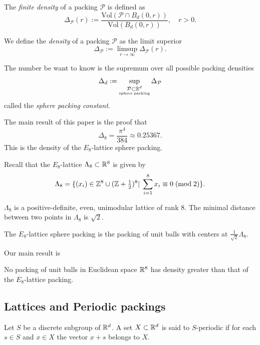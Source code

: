 \begin{definition}\label{def: finite density}
  The \emph{finite density} of a packing $\mathcal{P}$ is defined as
$$\Delta_{\mathcal{P}}(r):=\frac{\mathrm{Vol}(\mathcal{P}\cap B_d(0,r))}{\mathrm{Vol}(B_d(0,r))},\quad r>0.$$
\end{definition}

\begin{definition}\label{def: density}
  We define the \emph{density} of a packing $\mathcal{P}$ as the limit superior
$$\Delta_{\mathcal{P}}:=\limsup\limits_{r\to\infty}\Delta_{\mathcal{P}}(r). $$
\end{definition}

\begin{definition}\label{def: Sphere Packing Constant}
The number be want to know is the supremum over all possible packing densities
$$\Delta_d:=\sup\limits_{\substack{\mathcal{P}\subset\mathbb{R}^d\\ \scriptscriptstyle\mathrm{sphere}\;\mathrm{packing}}}\Delta_{\mathcal{P}} $$
called the \emph{sphere packing constant}.
\end{definition}

The main result of this paper is the proof that $$\Delta_8=\frac{\pi^4}{384}\approx 0.25367.$$
This is the density of the $E_8$-lattice sphere packing.
\begin{definition}\label{def: E8 lattice}
  Recall that the $E_8$-lattice $\Lambda_8\subset\mathbb{R}^8$ is given by
$$\Lambda_8=\{(x_i)\in\mathbb{Z}^8\cup(\mathbb{Z}+\textstyle\frac12\displaystyle )^8|\;\sum_{i=1}^8x_i\equiv 0\;(\mathrm{mod\;2})\}.$$
\end{definition}
\begin{lemma}\label{lemma: Characterisation of E8 lattice}
  $\Lambda_8$ is a positive-definite, even, unimodular lattice of rank 8. The minimal distance between two points in $\Lambda_8$ is $\sqrt{2}$.
\end{lemma}
\begin{definition}\label{def: E8 lattice packing}
The $E_8$-lattice sphere packing is the packing of unit balls with centers at $\frac{1}{\sqrt{2}}\Lambda_8.$
\end{definition}
Our main result is
\begin{theorem}\label{thm: main}
No packing of unit balls
in Euclidean space $\mathbb{R}^8$ has density greater than that of the $E_8$-lattice packing.
\end{theorem}

\subsection{Lattices and Periodic packings}
\begin{definition}\label{def: Periodicity}
  Let $S$ be a discrete subgroup of $\mathbb{R}^d$. A set $X\subset\mathbb{R}^d$ is said to $S$-periodic if for each $s\in S$ and $x\in X$ the vector $x+s$ belongs to $X$.
\end{definition}

